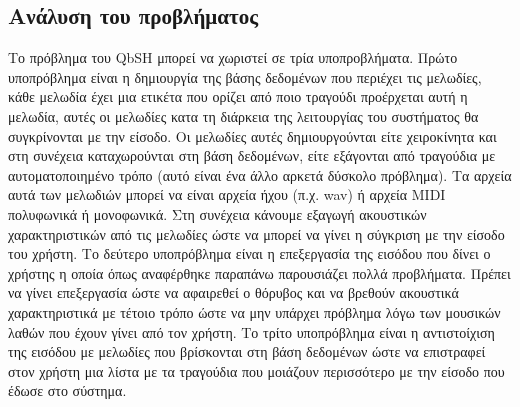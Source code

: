 \subsection{Ανάλυση του προβλήματος}
Το πρόβλημα του QbSH μπορεί να χωριστεί σε τρία υποπροβλήματα. Πρώτο
υποπρόβλημα είναι η δημιουργία της βάσης δεδομένων που περιέχει τις μελωδίες,
κάθε μελωδία έχει μια ετικέτα που ορίζει από ποιο τραγούδι προέρχεται αυτή η
μελωδία, αυτές οι μελωδίες κατα τη διάρκεια της λειτουργίας του συστήματος θα
συγκρίνονται με την είσοδο. Οι μελωδίες αυτές δημιουργούνται είτε χειροκίνητα
και στη συνέχεια καταχωρούνται στη βάση δεδομένων, είτε εξάγονται από τραγούδια
με αυτοματοποιημένο τρόπο (αυτό είναι ένα άλλο αρκετά δύσκολο πρόβλημα).
Τα αρχεία αυτά των μελωδιών μπορεί να είναι αρχεία ήχου (π.χ. wav) ή αρχεία
MIDI πολυφωνικά ή μονοφωνικά. Στη συνέχεια κάνουμε εξαγωγή ακουστικών
χαρακτηριστικών από τις μελωδίες ώστε να μπορεί να γίνει η σύγκριση με την
είσοδο του χρήστη.
\newline
Το δεύτερο υποπρόβλημα είναι η επεξεργασία της εισόδου που δίνει ο χρήστης η
οποία όπως αναφέρθηκε παραπάνω παρουσιάζει πολλά προβλήματα. Πρέπει να γίνει
επεξεργασία ώστε να αφαιρεθεί ο θόρυβος και να βρεθούν ακουστικά χαρακτηριστικά
με τέτοιο τρόπο ώστε να μην υπάρχει πρόβλημα λόγω των μουσικών λαθών που έχουν
γίνει από τον χρήστη.
\newline
Το τρίτο υποπρόβλημα είναι η αντιστοίχιση της εισόδου με μελωδίες που βρίσκονται
στη βάση δεδομένων ώστε να επιστραφεί στον χρήστη μια λίστα με τα τραγούδια που
μοιάζουν περισσότερο με την είσοδο που έδωσε στο σύστημα.
